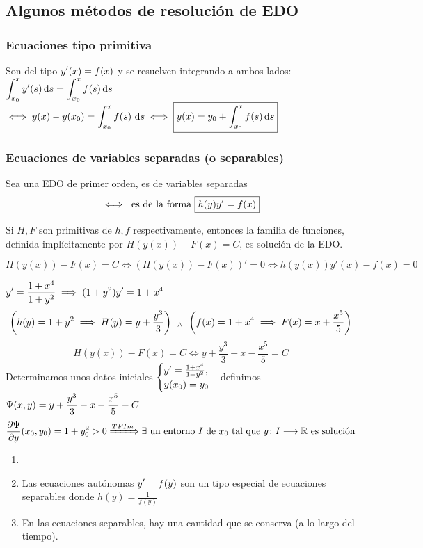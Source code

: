 \subsection{Algunos métodos de resolución de EDO}
\subsubsection{Ecuaciones tipo primitiva}
Son del tipo $\displaystyle y'(x)=f(x)$ y se resuelven integrando a ambos lados: $\ds \int_{x_0}^x y'(s)\odif{s}=\int_{x_0}^x f(s) \odif{s}$
$\ds \iff y(x)-y(x_0)=\int_{x_0}^x f(s) \,\odif{s} \iff \boxed{y(x) = y_0 + \int_{x_0}^x f(s)\odif{s}}$
\subsubsection{Ecuaciones de variables separadas (o separables)}
\begin{defn}
    Sea una EDO de primer orden, es de variables separadas
    \[\iff \text{ es de la forma } \boxed{h(y)y'=f(x)}\]
\end{defn}
\begin{prop}
    Si $H, F$ son primitivas de $h, f$ respectivamente, entonces la familia de funciones, definida implícitamente por $H(y(x))-F(x)=C$, es solución de la EDO.
    \begin{dem}
        \[H(y(x))-F(x)=C \iff \left(H(y(x))-F(x)\right)'=0 \iff h(y(x))y'(x)-f(x)=0\]
    \end{dem}
\end{prop}
\begin{ejem}
    $\displaystyle y'=\frac{1+x^4}{1+y^2} \implies (1+y^2)y'=1+x^4$
    \[\left(h(y)=1+y^2 \implies H(y)=y + \frac{y^3}{3}\right) \, \; _{\wedge} \; \, \left(f(x)=1+x^4 \implies F(x)=x+\frac{x^5}{5}\right)\]
    \[H(y(x))-F(x)=C \iff y + \frac{y^3}{3}-x-\frac{x^5}{5} = C\]
    Determinamos unos datos iniciales $\displaystyle \begin{cases}
        y'=\frac{1+x^4}{1+y^2}, \\
        y(x_0)=y_0
    \end{cases}$definimos $\displaystyle \Psi(x, y)=y + \frac{y^3}{3}-x-\frac{x^5}{5}-C$
    \[\frac{\partial\Psi}{\partial y}(x_0, y_0) = 1+ y_0^2>0 \xRightarrow{TFIm} \exists \text{ un entorno } I \text{ de } x_0 \text{ tal que } y \colon I \longrightarrow \mathbb{R} \text{ es solución}\]
\end{ejem}

\begin{obs}
    \begin{enumerate}
    \item[] 
        \item Las ecuaciones autónomas $\displaystyle y'=f(y)$ son un tipo especial de ecuaciones separables donde $h(y)=\frac{1}{f(y)}$
        \item En las ecuaciones separables, hay una cantidad que se conserva (a lo largo del tiempo).
    \end{enumerate}
\end{obs}

